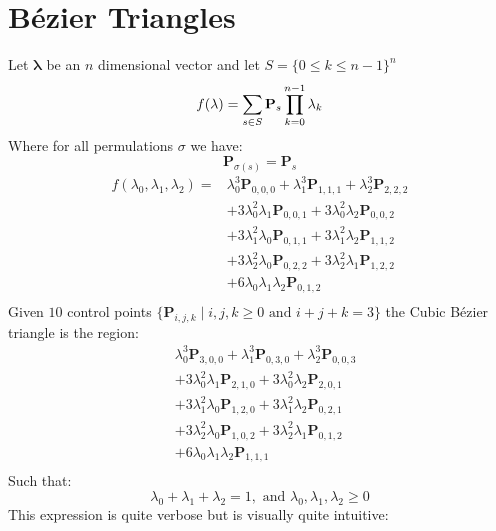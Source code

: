 
\section{Bézier Triangles}
Let $\mathbf{\lambda}$ be an $n$ dimensional vector and let $S = \{0\leq k\leq n-1\}^n$
\[
	f(\mathbf{\lambda}) =\sum_{s\in S}\mathbf{P}_s\prod_{k=0}^{n-1}\lambda_k\\
\]
Where for all permulations $\sigma$ we have:
\[
	\mathbf{P}_{\sigma(s)} = \mathbf{P}_s
\]
\[\begin{aligned}
	f(\lambda_0,\lambda_1,\lambda_2) =& \lambda_0^3\mathbf{P}_{0,0,0}+\lambda_1^3\mathbf{P}_{1,1,1}+\lambda_2^3\mathbf{P}_{2,2,2}\\
	&+3\lambda_0^2\lambda_1\mathbf{P}_{0,0,1}+3\lambda_0^2\lambda_2\mathbf{P}_{0,0,2}\\
	&+3\lambda_1^2\lambda_0\mathbf{P}_{0,1,1}+3\lambda_1^2\lambda_2\mathbf{P}_{1,1,2}\\
	&+3\lambda_2^2\lambda_0\mathbf{P}_{0,2,2}+3\lambda_2^2\lambda_1\mathbf{P}_{1,2,2}\\
	&+6\lambda_0\lambda_1\lambda_2\mathbf{P}_{0,1,2}\\
\end{aligned}\]
Given $10$ control points $\{\mathbf{P}_{i,j,k}\mid i,j,k\geq 0 \text{ and }i+j+k=3\}$ the Cubic Bézier triangle is the region:
\[\begin{aligned}
&\lambda_0^3\mathbf{P}_{3,0,0}+\lambda_1^3\mathbf{P}_{0,3,0}+\lambda_2^3\mathbf{P}_{0,0,3}\\
&+3\lambda_0^2\lambda_1\mathbf{P}_{2,1,0}+3\lambda_0^2\lambda_2\mathbf{P}_{2,0,1}\\
&+3\lambda_1^2\lambda_0\mathbf{P}_{1,2,0}+3\lambda_1^2\lambda_2\mathbf{P}_{0,2,1}\\
&+3\lambda_2^2\lambda_0\mathbf{P}_{1,0,2}+3\lambda_2^2\lambda_1\mathbf{P}_{0,1,2}\\
&+6\lambda_0\lambda_1\lambda_2\mathbf{P}_{1,1,1}\\
\end{aligned}\]
Such that:
\[\lambda_0+\lambda_1+\lambda_2 = 1,\text{ and } \lambda_0,\lambda_1,\lambda_2\geq0\]
This expression is quite verbose but is visually quite intuitive:
